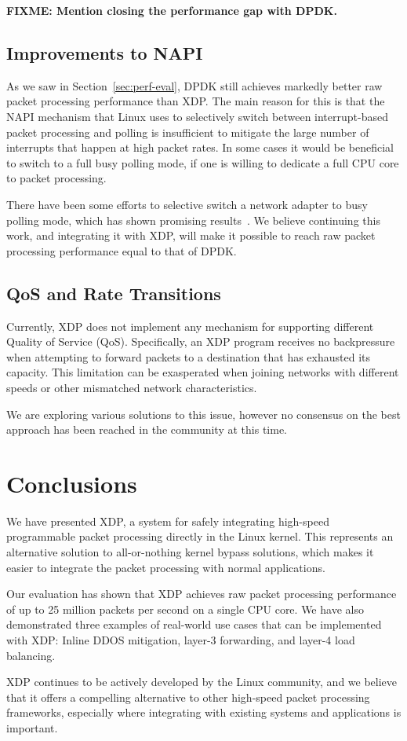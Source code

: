 \documentclass[10pt,sigconf]{acmart}
\begin{document}
\textbf{FIXME: Mention closing the performance gap with DPDK.}

\subsection{Improvements to NAPI}
\label{sec:improvements-napi}
As we saw in Section~\ref{sec:perf-eval}, DPDK still achieves markedly better
raw packet processing performance than XDP. The main reason for this is that the
NAPI mechanism that Linux uses to selectively switch between interrupt-based
packet processing and polling is insufficient to mitigate the large number of
interrupts that happen at high packet rates. In some cases it would be
beneficial to switch to a full busy polling mode, if one is willing to dedicate
a full CPU core to packet processing.

There have been some efforts to selective switch a network adapter to busy
polling mode, which has shown promising results~\cite{dumazet17:_busyp}. We
believe continuing this work, and integrating it with XDP, will make it possible
to reach raw packet processing performance equal to that of DPDK.

\subsection{QoS and Rate Transitions}
\label{sec:handl-rate-trans}
Currently, XDP does not implement any mechanism for supporting different Quality
of Service (QoS). Specifically, an XDP program receives no backpressure when
attempting to forward packets to a destination that has exhausted its capacity.
This limitation can be exasperated when joining networks with different speeds
or other mismatched network characteristics.

We are exploring various solutions to this issue, however no consensus on the
best approach has been reached in the community at this time.


\section{Conclusions}
\label{sec:conclusion}
We have presented XDP, a system for safely integrating high-speed programmable
packet processing directly in the Linux kernel. This represents an alternative
solution to all-or-nothing kernel bypass solutions, which makes it easier to
integrate the packet processing with normal applications.

Our evaluation has shown that XDP achieves raw packet processing performance of
up to 25 million packets per second on a single CPU core. We have also
demonstrated three examples of real-world use cases that can be implemented with
XDP: Inline DDOS mitigation, layer-3 forwarding, and layer-4 load balancing.

XDP continues to be actively developed by the Linux community, and we believe
that it offers a compelling alternative to other high-speed packet processing
frameworks, especially where integrating with existing systems and applications
is important.



\end{document}
